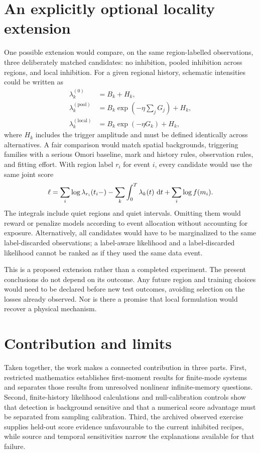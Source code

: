 \section{An explicitly optional locality extension}

One possible extension would compare, on the same region-labelled observations, three deliberately matched candidates: no inhibition, pooled inhibition across regions, and local inhibition. For a given regional history, schematic intensities could be written as
\begin{align}
  \lambda_k^{(0)}&=B_k+H_k, \label{eq:locality-none}\\
  \lambda_k^{(\mathrm{pool})}
    &=B_k\exp\!\left(-\eta\sum_jG_j\right)+H_k, \label{eq:locality-pooled}\\
  \lambda_k^{(\mathrm{local})}
    &=B_k\exp(-\eta G_k)+H_k, \label{eq:locality-local}
\end{align}
where \(H_k\) includes the trigger amplitude and must be defined identically across alternatives. A fair comparison would match spatial backgrounds, triggering families with a serious Omori baseline, mark and history rules, observation rules, and fitting effort. With region label \(r_i\) for event \(i\), every candidate would use the same joint score
\begin{equation}
 \ell=\sum_i\log\lambda_{r_i}(t_i-)
      -\sum_k\int_0^T\lambda_k(t)\,\mathop{}\!\mathrm{d} t
      +\sum_i\log f(m_i).
 \label{eq:proposed-spatial-score}
\end{equation}
The integrals include quiet regions and quiet intervals. Omitting them would reward or penalize models according to event allocation without accounting for exposure. Alternatively, all candidates would have to be marginalized to the same label-discarded observations; a label-aware likelihood and a label-discarded likelihood cannot be ranked as if they used the same data event.

This is a proposed extension rather than a completed experiment. The present conclusions do not depend on its outcome. Any future region and training choices would need to be declared before new test outcomes, avoiding selection on the losses already observed. Nor is there a promise that local formulation would recover a physical mechanism.

\section{Contribution and limits}

Taken together, the work makes a connected contribution in three parts. First, restricted mathematics establishes first-moment results for finite-mode systems and separates those results from unresolved nonlinear infinite-memory questions. Second, finite-history likelihood calculations and null-calibration controls show that detection is background sensitive and that a numerical score advantage must be separated from sampling calibration. Third, the archived observed exercise supplies held-out score evidence unfavourable to the current inhibited recipes, while source and temporal sensitivities narrow the explanations available for that failure.

